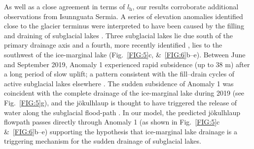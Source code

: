 \documentclass[tc, manuscript]{copernicus}
\providecommand{\DIFaddbegin}{} %
\providecommand{\DIFaddend}{} %
\begin{document}
\DIFaddbegin 


\DIFaddend As well as a close agreement in terms of $l_{\mathrm{h}}$, our results corroborate additional observations from Isunnguata Sermia. A series of elevation anomalies identified close to the glacier terminus were interpreted to have been caused by the filling and draining of subglacial lakes \citep{livingstone2019brief,livingstone2025ice}. Three subglacial lakes \citep[labelled SGL 1--3 in][]{livingstone2025ice} lie due south of the primary drainage axis \citep[Fig.~\ref{FIG:5}c, \&~\ref{FIG:6}b--e][]{livingstone2019brief} and a fourth, more recently identified \citep[labelled Anomaly 1 in][]{livingstone2025ice}, lies to the southwest of the ice-marginal lake (Fig.~\ref{FIG:5}c, \&~\ref{FIG:6}b--e). Between June and September 2019, Anomaly 1 experienced rapid subsidence (up to 38 m) after a long period of slow uplift; a pattern consistent with the fill--drain cycles of active subglacial lakes elsewhere \citep{livingstone2025ice}. The sudden subsidence of Anomaly 1 was coincident with the complete drainage of the ice-marginal lake during 2019 (see Fig.~\ref{FIG:5}g), and the jökulhlaup is thought to have triggered the release of water along the subglacial flood-path \citep{livingstone2025ice}. In our model, the predicted jökulhlaup flowpath passes directly through Anomaly 1 (as shown in Fig.~\ref{FIG:5}c \&~\ref{FIG:6}b--e) supporting the hypothesis that ice-marginal lake drainage is a triggering mechanism for the sudden drainage of subglacial lakes. 
\end{document}
